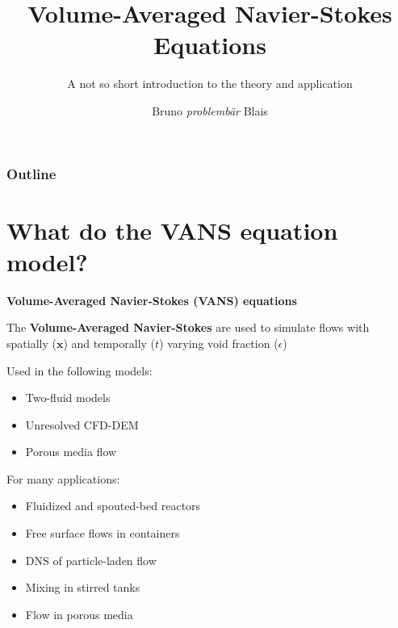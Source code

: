 \documentclass[c,11pt,xcolor=dvipsnames, aspectratio=169]{beamer}
\title{\textbf{Volume-Averaged Navier-Stokes Equations}}
\subtitle{A not so short introduction to the theory and application}
\author{Bruno \textit{problembär} Blais}
\begin{document}
{
\begin{frame}[noframenumbering]
  \titlepage
\end{frame}
}

\begin{frame}
	\frametitle{\textbf{Outline}}
	\tableofcontents
\end{frame}

\section{What do the VANS equation model?}


\begin{frame}{\textbf{Volume-Averaged Navier-Stokes (VANS) equations}}
	\visible<1->
	{\begin{shaded}
			The \textbf{Volume-Averaged Navier-Stokes} are used to simulate flows with spatially ($\bm{x}$) and temporally ($t$) varying void fraction ($\epsilon$)
	\end{shaded}}
	
	\begin{minipage}[t]{0.48\linewidth}
		{
			\begin{block}{Used in the following models:}
				\begin{itemize}
					\item Two-fluid models
					\item Unresolved CFD-DEM
					\item Porous media flow
				\end{itemize}
			\end{block}
		}
	\end{minipage}%
	\hfill%
	\begin{minipage}[t]{0.48\linewidth}
		{
			\begin{block}{For many applications:}
				\begin{itemize}
					\item Fluidized and spouted-bed reactors
					\item Free surface flows in containers
					\item DNS of particle-laden flow
					\item Mixing in stirred tanks 
					\item Flow in porous media
				\end{itemize}
			\end{block}
		}
	\end{minipage}
\end{frame}
\end{document}
